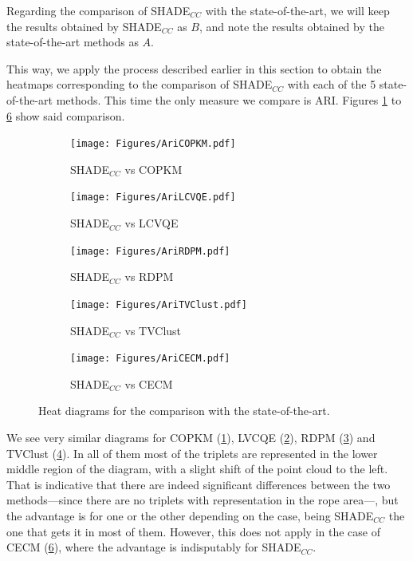\documentclass[review]{elsarticle}
\begin{document}
Regarding the comparison of SHADE$_{CC}$ with the state-of-the-art, we will keep the results obtained by SHADE$_{CC}$ as $B$, and note the results obtained by the state-of-the-art methods as $A$.

This way, we apply the process described earlier in this section to obtain the heatmaps corresponding to the comparison of SHADE$_{CC}$ with each of the 5 state-of-the-art methods. This time the only measure we compare is ARI. Figures \ref{fig:bayesCOPKM} to \ref{fig:bayesCECM} show said comparison.

\begin{figure}[ht!]
	\centering
	\begin{subfigure}{.45\textwidth}
		\texttt{[image: Figures/AriCOPKM.pdf]}
		\caption{SHADE$_{CC}$ vs COPKM}
		\label{fig:bayesCOPKM}
	\end{subfigure}
	\begin{subfigure}{.45\textwidth}
		\texttt{[image: Figures/AriLCVQE.pdf]}
		\caption{SHADE$_{CC}$ vs LCVQE}
		\label{fig:bayesLCVQE}
	\end{subfigure}
	\begin{subfigure}{.45\textwidth}
		\texttt{[image: Figures/AriRDPM.pdf]}
		\caption{SHADE$_{CC}$ vs RDPM}
		\label{fig:bayesRDPM}
	\end{subfigure}
	\begin{subfigure}{.45\textwidth}
		\texttt{[image: Figures/AriTVClust.pdf]}
		\caption{SHADE$_{CC}$ vs TVClust}
		\label{fig:bayesTVClust}
	\end{subfigure}
	\begin{subfigure}{.45\textwidth}
		\texttt{[image: Figures/AriCECM.pdf]}
		\caption{SHADE$_{CC}$ vs CECM}
		\label{fig:bayesCECM}
	\end{subfigure}
	\caption{Heat diagrams for the comparison with the state-of-the-art.}
\end{figure}

We see very similar diagrams for COPKM (\ref{fig:bayesCOPKM}), LVCQE (\ref{fig:bayesLCVQE}), RDPM (\ref{fig:bayesRDPM}) and TVClust (\ref{fig:bayesTVClust}). In all of them most of the triplets are represented in the lower middle region of the diagram, with a slight shift of the point cloud to the left. That is indicative that there are indeed significant differences between the two methods---since there are no triplets with representation in the rope area---, but the advantage is for one or the other depending on the case, being SHADE$_{CC}$ the one that gets it in most of them. However, this does not apply in the case of CECM (\ref{fig:bayesCECM}), where the advantage is indisputably for SHADE$_{CC}$.
\end{document}
